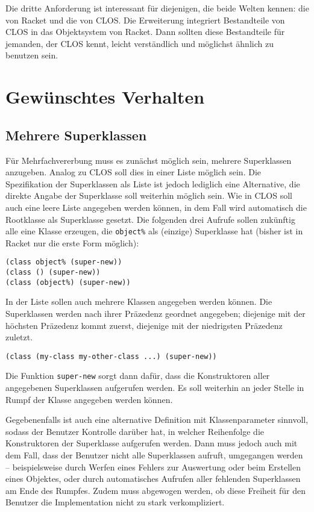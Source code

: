 Die dritte Anforderung ist interessant für diejenigen, die beide Welten kennen: die von Racket und die von CLOS. Die Erweiterung integriert Bestandteile von CLOS in das Objektsystem von Racket. Dann sollten diese Bestandteile für jemanden, der CLOS kennt, leicht verständlich und möglichst ähnlich zu benutzen sein.

\section{Gewünschtes Verhalten}

\subsection{Mehrere Superklassen}
Für Mehrfachvererbung muss es zunächst möglich sein, mehrere Superklassen anzugeben. Analog zu CLOS soll dies in einer Liste möglich sein. Die Spezifikation der Superklassen als Liste ist jedoch lediglich eine Alternative, die direkte Angabe der Superklasse soll weiterhin möglich sein. Wie in CLOS soll auch eine leere Liste angegeben werden können, in dem Fall wird automatisch die Rootklasse als Superklasse gesetzt. Die folgenden drei Aufrufe sollen zukünftig alle eine Klasse erzeugen, die \texttt{object\%} als (einzige) Superklasse hat (bisher ist in Racket nur die erste Form möglich):

\begin{lstlisting}
(class object% (super-new))
(class () (super-new))
(class (object%) (super-new))
\end{lstlisting}

In der Liste sollen auch mehrere Klassen angegeben werden können. Die Superklassen werden nach ihrer Präzedenz geordnet angegeben; diejenige mit der höchsten Präzedenz kommt zuerst, diejenige mit der niedrigsten Präzedenz zuletzt. 

\begin{lstlisting}
(class (my-class my-other-class ...) (super-new)) 
\end{lstlisting}

Die Funktion \texttt{super-new} sorgt dann dafür, dass die Konstruktoren aller angegebenen  Superklassen aufgerufen werden. Es soll weiterhin an jeder Stelle in Rumpf der Klasse angegeben werden können. 

Gegebenenfalls ist auch eine alternative Definition mit Klassenparameter sinnvoll, sodass der Benutzer Kontrolle darüber hat, in welcher Reihenfolge die Konstruktoren der Superklasse aufgerufen werden. Dann muss jedoch auch mit dem Fall, dass der Benutzer nicht alle Superklassen aufruft, umgegangen werden -- beispielsweise durch Werfen eines Fehlers zur Auswertung oder beim Erstellen eines Objektes, oder durch automatisches Aufrufen aller fehlenden Superklassen am Ende des Rumpfes. Zudem muss abgewogen werden, ob diese Freiheit für den Benutzer die Implementation nicht zu stark verkompliziert.

